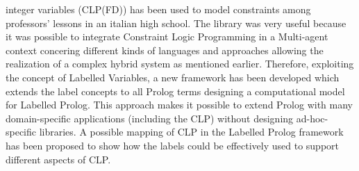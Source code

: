 integer variables (CLP(FD)) has been used to model constraints among professors' lessons in an italian high school. The library was very useful because it was possible to integrate
Constraint Logic Programming in a Multi-agent context concering different kinds of languages and approaches allowing the realization of a complex hybrid system as mentioned earlier.\newline\newline
Therefore, exploiting the concept of Labelled Variables, a new framework has been developed which extends the label concepts to all Prolog terms designing a computational model for Labelled Prolog. This approach makes it possible to extend Prolog with many domain-specific applications (including the CLP) without designing ad-hoc-specific libraries.\newline
A possible mapping of CLP in the Labelled Prolog framework has been proposed to show how the labels could be effectively used to support different aspects of CLP.

